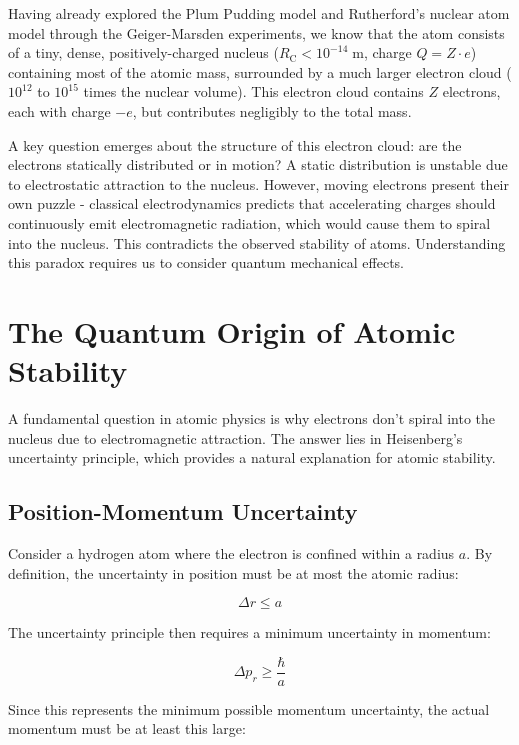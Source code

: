 \documentclass[
  a4paper,
]{book}
\begin{document}
Having already explored the Plum Pudding model and Rutherford's nuclear
atom model through the Geiger-Marsden experiments, we know that the atom
consists of a tiny, dense, positively-charged nucleus
(\(R_{\mathrm{C}} < 10^{-14} \; \mathrm{m}\), charge \(Q = Z\cdot e\))
containing most of the atomic mass, surrounded by a much larger electron
cloud (\(10^{12}\) to \(10^{15}\) times the nuclear volume). This
electron cloud contains \(Z\) electrons, each with charge \(-e\), but
contributes negligibly to the total mass.

A key question emerges about the structure of this electron cloud: are
the electrons statically distributed or in motion? A static distribution
is unstable due to electrostatic attraction to the nucleus. However,
moving electrons present their own puzzle - classical electrodynamics
predicts that accelerating charges should continuously emit
electromagnetic radiation, which would cause them to spiral into the
nucleus. This contradicts the observed stability of atoms. Understanding
this paradox requires us to consider quantum mechanical effects.

\section{The Quantum Origin of Atomic
Stability}\label{the-quantum-origin-of-atomic-stability}

A fundamental question in atomic physics is why electrons don't spiral
into the nucleus due to electromagnetic attraction. The answer lies in
Heisenberg's uncertainty principle, which provides a natural explanation
for atomic stability.

\subsection{Position-Momentum
Uncertainty}\label{position-momentum-uncertainty-1}

Consider a hydrogen atom where the electron is confined within a radius
\(a\). By definition, the uncertainty in position must be at most the
atomic radius:

\[
\Delta r \le a
\]

The uncertainty principle then requires a minimum uncertainty in
momentum:

\[
\Delta p_r \ge \frac{\hbar}{a}
\]

Since this represents the minimum possible momentum uncertainty, the
actual momentum must be at least this large:
\end{document}
